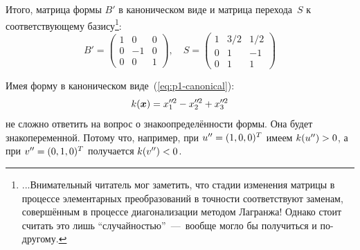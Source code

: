 \documentclass[a4paper,12pt]{article}
\newcommand*{\dprime}{{\prime\prime}\mkern-1.2mu}
\begin{document}
\begin{solution}
    Итого, матрица формы $B'$ в каноническом виде и матрица перехода~$S$ к соответствующему базису\footnote{
    ...Внимательный читатель мог заметить, что стадии изменения матрицы в процессе элементарных преобразований в точности соответствуют заменам, совершённым в процессе диагонализации методом Лагранжа!
    Однако стоит считать это лишь ``случайностью''~---~вообще могло бы получиться и по-другому.}:
    \[
      B' = \begin{pmatrix}
        1 & 0  & 0\\
        0 & -1 & 0\\
        0 & 0  & 1
      \end{pmatrix},\quad S = \begin{pmatrix}
        1 & 3/2 & 1/2\\
        0 & 1   & -1\\
        0 & 1   & 1
      \end{pmatrix}
    \]
    
    \bigskip
    
    Имея форму в каноническом виде~(\ref{eq:p1-canonical}):
    \[
      k(\bds x) = x_1^{\dprime 2} - x_2^{\dprime 2} + x_3^{\dprime 2}
    \]
    не сложно ответить на вопрос о знакоопределённости формы.
    Она будет знакопеременной.
    Потому что, например, при $u'' \hm= (1, 0, 0)^T$ имеем $k(u'') \hm> 0$, а при $v'' \hm= (0, 1, 0)^T$ получается $k(v'') \hm< 0$.
  \end{solution}
\end{document}
